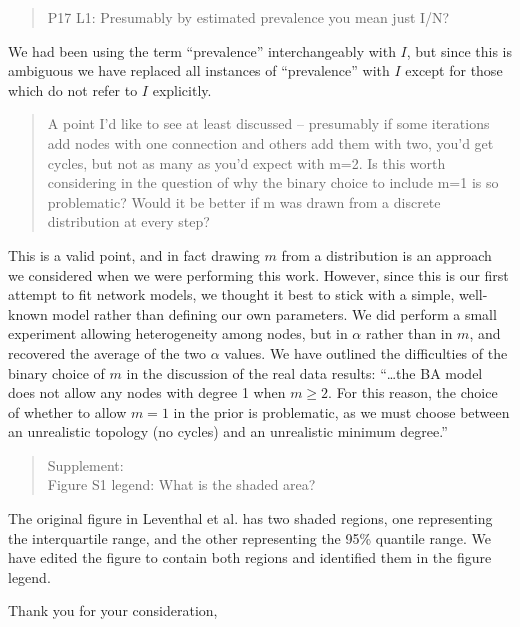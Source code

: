 \documentclass[12pt]{letter}
\begin{document}
\begin{letter}{ }
\begin{quote}
  \itshape

  P17
  L1: Presumably by estimated prevalence you mean just I/N?
\end{quote}

We had been using the term ``prevalence'' interchangeably with $I$, but since
this is ambiguous we have replaced all instances of ``prevalence'' with $I$
except for those which do not refer to $I$ explicitly.

\begin{quote}
  \itshape

  A point I'd like to see at least discussed -- presumably if some iterations
  add nodes with one connection and others add them with two, you'd get cycles,
  but not as many as you'd expect with m=2. Is this worth considering in the
  question of why the binary choice to include m=1 is so problematic? Would it
  be better if m was drawn from a discrete distribution at every step?
\end{quote}

This is a valid point, and in fact drawing $m$ from a distribution is an
approach we considered when we were performing this work. However, since this
is our first attempt to fit network models, we thought it best to stick with
a simple, well-known model rather than defining our own parameters. We did
perform a small experiment allowing heterogeneity among nodes, but in $\alpha$
rather than in $m$, and recovered the average of the two $\alpha$ values. We
have outlined the difficulties of the binary choice of $m$ in the discussion of
the real data results: ``\ldots the BA model does not allow any nodes with
degree 1 when $m \geq 2$. For this reason, the choice of whether to allow $m =
1$ in the prior is problematic, as we must choose between an unrealistic
topology (no cycles) and an unrealistic minimum degree.''

\begin{quote}
  \itshape

  Supplement: \\
  Figure S1 legend: What is the shaded area?
\end{quote}

The original figure in Leventhal et al. has two shaded regions, one
representing the interquartile range, and the other representing the 95\%
quantile range. We have edited the figure to contain both regions and
identified them in the figure legend.

\closing{Thank you for your consideration,}
\end{letter}
\end{document}
